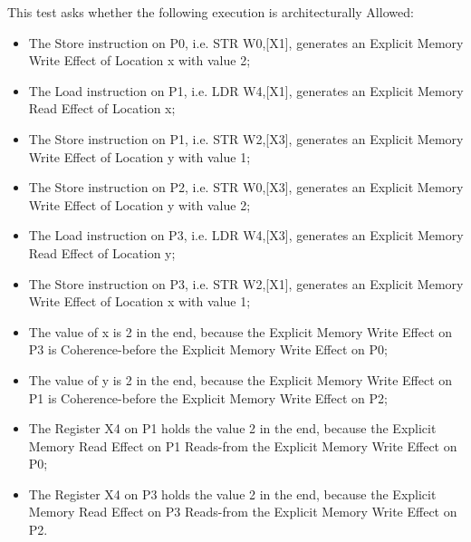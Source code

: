 This test asks whether the following execution is architecturally Allowed:

\begin{itemize}
  \item The Store instruction on P0, i.e. STR W0,[X1], generates an Explicit Memory Write Effect of Location x with value 2;
  \item The Load instruction on P1, i.e. LDR W4,[X1], generates an Explicit Memory Read Effect of Location x;
  \item The Store instruction on P1, i.e. STR W2,[X3], generates an Explicit Memory Write Effect of Location y with value 1;
  \item The Store instruction on P2, i.e. STR W0,[X3], generates an Explicit Memory Write Effect of Location y with value 2;
  \item The Load instruction on P3, i.e. LDR W4,[X3], generates an Explicit Memory Read Effect of Location y;
  \item The Store instruction on P3, i.e. STR W2,[X1], generates an Explicit Memory Write Effect of Location x with value 1;
  \item The value of x is 2 in the end, because the Explicit Memory Write Effect on P3 is Coherence-before the Explicit Memory Write Effect on P0;
  \item The value of y is 2 in the end, because the Explicit Memory Write Effect on P1 is Coherence-before the Explicit Memory Write Effect on P2;
  \item The Register X4 on P1 holds the value 2 in the end, because the Explicit Memory Read Effect on P1 Reads-from the Explicit Memory Write Effect on P0;
  \item The Register X4 on P3 holds the value 2 in the end, because the Explicit Memory Read Effect on P3 Reads-from the Explicit Memory Write Effect on P2.
\end{itemize}
